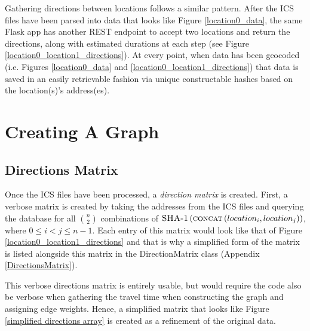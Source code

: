 \documentclass[letterpaper,11pt]{report}
\theoremstyle{definition}
\theoremstyle{definition}
\begin{document}
Gathering directions between locations follows a similar pattern. After the ICS files have been parsed into data that looks like Figure \ref{location0_data}, the same Flask app has another REST endpoint to accept two locations and return the directions, along with estimated durations at each step (see Figure \ref{location0_location1_directions}). At every point, when data has been geocoded (i.e. Figures \ref{location0_data} and \ref{location0_location1_directions}) that data is saved in an easily retrievable fashion via unique constructable hashes based on the location(s)'s address(es).

\section{Creating A Graph}
\subsection{Directions Matrix}
Once the ICS files have been processed, a \emph{direction matrix} is created. First, a verbose matrix is created by taking the addresses from the ICS files and querying the database for all $n \choose 2$ combinations of $\textsc{SHA-1}\left(\textsc{concat}\left(location_i, location_j\right)\right)$, where $0 \leq i < j \leq n-1$. Each entry of this matrix would look like that of Figure \ref{location0_location1_directions} and that is why a simplified form of the matrix is listed alongside this matrix in the DirectionMatrix class (Appendix \ref{DirectionsMatrix}).

This verbose directions matrix is entirely usable, but would require the code also be verbose when gathering the travel time when constructing the graph and assigning edge weights. Hence, a simplified matrix that looks like Figure \ref{simplified directions array} is created as a refinement of the original data.
\end{document}
